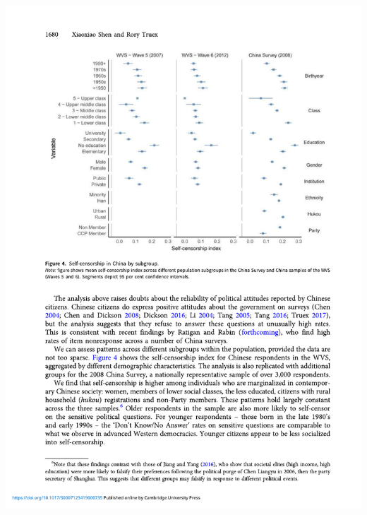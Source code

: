 \documentclass[
  10pt,
  ignorenonframetext,
]{beamer}
\begin{document}
\begin{frame}
\begin{center}\includegraphics[width=0.9\linewidth]{Figs/Examples/truex_res} \end{center}
\end{frame}
\end{document}
